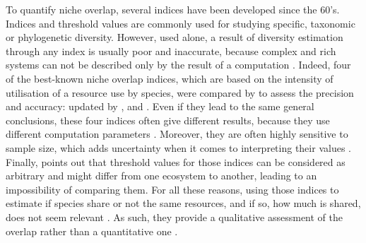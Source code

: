 To quantify niche overlap, several indices have been developed since the 60’s. Indices and threshold values are commonly used for studying specific, taxonomic or phylogenetic diversity. However, used alone, a result of diversity estimation through any index is usually poor and inaccurate, because complex and rich systems can not be described only by the result of a computation \citep{mejri2009}. Indeed, four of the best-known niche overlap indices, which are based on the intensity of utilisation of a resource use by species, were compared by \citet{linton1981} to assess the precision and accuracy: \citet{morisita1959} updated by \citet{horn1966}, \citet{schoener1968} and \citet{pianka1973}. Even if they lead to the same general conclusions, these four indices often give different results, because they use different computation parameters \citep{blondel1979}. Moreover, they are often highly sensitive to sample size, which adds uncertainty when it comes to interpreting their values \citep{linton1981}. Finally, \citet{grossman2009} points out that threshold values for those indices can be considered as arbitrary and might differ from one ecosystem to another, leading to an impossibility of comparing them. For all these reasons, using those indices to estimate if species share or not the same resources, and if so, how much is shared, does not seem relevant \citep{mouillot2005}. As such, they provide a qualitative assessment of the overlap rather than a quantitative one \citep{linton1981}.

